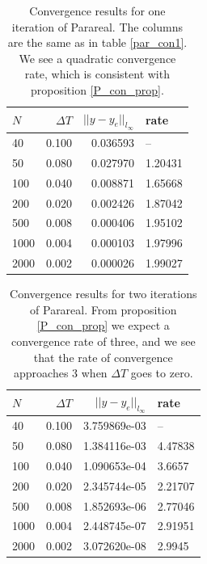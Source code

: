 \begin{table}[h]
\centering
\caption{Convergence results for one iteration of Parareal. The columns are the same as in table \ref{par_con1}. We see a quadratic convergence rate, which is consistent with proposition \ref{P_con_prop}.}
\label{par_con2}
\begin{tabular}{lrrl}
\toprule
{}$N$ &      $\Delta T$ &       $||y-y_e||_{l_{\infty}}$ &     rate \\
\midrule
40   &  0.100 &  0.036593 &       -- \\
50   &  0.080 &  0.027970 &  1.20431 \\
100  &  0.040 &  0.008871 &  1.65668 \\
200  &  0.020 &  0.002426 &  1.87042 \\
500  &  0.008 &  0.000406 &  1.95102 \\
1000 &  0.004 &  0.000103 &  1.97996 \\
2000 &  0.002 &  0.000026 &  1.99027 \\
\bottomrule
\end{tabular}
\end{table}
\begin{table}[h]
\centering
\caption{Convergence results for two iterations of Parareal. From proposition \ref{P_con_prop} we expect a convergence rate of three, and we see that the rate of convergence approaches 3 when $\Delta T$ goes to zero.}
\label{par_con3}
\begin{tabular}{lrrl}
\toprule
{}$N$ &      $\Delta T$ &       $||y-y_e||_{l_{\infty}}$ &     rate \\
\midrule
40   &  0.100 &  3.759869e-03 &       -- \\
50   &  0.080 &  1.384116e-03 &  4.47838 \\
100  &  0.040 &  1.090653e-04 &   3.6657 \\
200  &  0.020 &  2.345744e-05 &  2.21707 \\
500  &  0.008 &  1.852693e-06 &  2.77046 \\
1000 &  0.004 &  2.448745e-07 &  2.91951 \\
2000 &  0.002 &  3.072620e-08 &   2.9945 \\
\bottomrule
\end{tabular}
\end{table}
